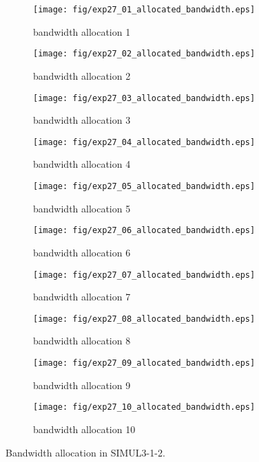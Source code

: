 	\begin{figure}
		\begin{center}
			\begin{subfigure}[b]{0.32\textwidth}
				\texttt{[image: fig/exp27\_01\_allocated\_bandwidth.eps]}
				\caption{bandwidth allocation 1}
				\label{figure:simul3_1_2_b_a}
			\end{subfigure}
			\begin{subfigure}[b]{0.32\textwidth}
				\texttt{[image: fig/exp27\_02\_allocated\_bandwidth.eps]}
				\caption{bandwidth allocation 2}
				\label{figure:simul3_1_2_b_b}
			\end{subfigure}
			\begin{subfigure}[b]{0.32\textwidth}
				\texttt{[image: fig/exp27\_03\_allocated\_bandwidth.eps]}
				\caption{bandwidth allocation 3}
				\label{figure:simul3_1_2_b_c}
			\end{subfigure}
			\begin{subfigure}[b]{0.32\textwidth}
				\texttt{[image: fig/exp27\_04\_allocated\_bandwidth.eps]}
				\caption{bandwidth allocation 4}
				\label{figure:simul3_1_2_b_d}
			\end{subfigure}
			\begin{subfigure}[b]{0.32\textwidth}
				\texttt{[image: fig/exp27\_05\_allocated\_bandwidth.eps]}
				\caption{bandwidth allocation 5}
				\label{figure:simul3_1_2_b_e}
			\end{subfigure}
			\begin{subfigure}[b]{0.32\textwidth}
				\texttt{[image: fig/exp27\_06\_allocated\_bandwidth.eps]}
				\caption{bandwidth allocation 6}
				\label{figure:simul3_1_2_b_f}
			\end{subfigure}
			\begin{subfigure}[b]{0.32\textwidth}
				\texttt{[image: fig/exp27\_07\_allocated\_bandwidth.eps]}
				\caption{bandwidth allocation 7}
				\label{figure:simul3_1_2_b_g}
			\end{subfigure}
			\begin{subfigure}[b]{0.32\textwidth}
				\texttt{[image: fig/exp27\_08\_allocated\_bandwidth.eps]}
				\caption{bandwidth allocation 8}
				\label{figure:simul3_1_2_b_h}
			\end{subfigure}
			\begin{subfigure}[b]{0.32\textwidth}
				\texttt{[image: fig/exp27\_09\_allocated\_bandwidth.eps]}
				\caption{bandwidth allocation 9}
				\label{figure:simul3_1_2_b_i}
			\end{subfigure}
			\begin{subfigure}[b]{0.32\textwidth}
				\texttt{[image: fig/exp27\_10\_allocated\_bandwidth.eps]}
				\caption{bandwidth allocation 10}
				\label{figure:simul3_1_2_b_j}
			\end{subfigure}
			\caption{Bandwidth allocation in SIMUL3-1-2.}
			\label{figure:simul3_1_2_ba}
		\end{center}
	\end{figure}


